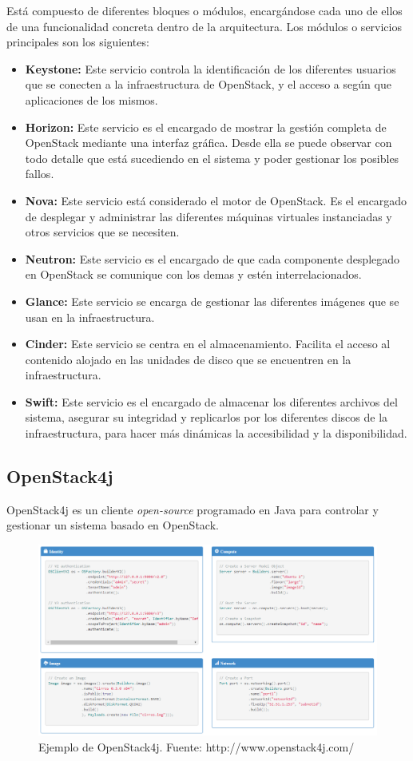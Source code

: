 Está compuesto de diferentes bloques o módulos, encargándose cada uno de ellos de una funcionalidad concreta dentro de la arquitectura. Los módulos o servicios principales son los siguientes:

\begin{itemize}
	\item \textbf{Keystone:}  Este servicio controla la identificación de los diferentes usuarios que se conecten a la infraestructura de OpenStack, y el acceso a según que aplicaciones de los mismos.
	
	\item \textbf{Horizon:} Este servicio es el encargado de mostrar la gestión completa de OpenStack mediante una interfaz gráfica. Desde ella se puede observar con todo detalle que está sucediendo en el sistema y poder gestionar los posibles fallos.
	
	\item \textbf{Nova:} Este servicio está considerado el motor de OpenStack. Es el encargado de desplegar y administrar las diferentes máquinas virtuales instanciadas y otros servicios que se necesiten.
	
	\item \textbf{Neutron:} Este servicio es el encargado de que cada componente desplegado en OpenStack se comunique con los demas y estén interrelacionados.
	
	\item \textbf{Glance:} Este servicio se encarga de gestionar las diferentes imágenes que se usan en la infraestructura.
	
	\item \textbf{Cinder:} Este servicio se centra en el almacenamiento. Facilita el acceso al contenido alojado en las unidades de disco que se encuentren en la infraestructura.
	
	\item \textbf{Swift:} Este servicio es el encargado de almacenar los diferentes archivos del sistema, asegurar su integridad y replicarlos por los diferentes discos de la infraestructura, para hacer más dinámicas la accesibilidad y la disponibilidad.
\end{itemize}

\subsection{OpenStack4j}
\label{subsec:openstack4j}

OpenStack4j es un cliente \textit{open-source} programado en Java para controlar y gestionar un sistema basado en OpenStack.

\begin{figure}[!ht]
	\centering
	\includegraphics[width=0.8\linewidth]{imagenes/ejemplo_os4j}
	\caption{Ejemplo de OpenStack4j. Fuente: http://www.openstack4j.com/}
	\label{fig:ejemploos4j}
\end{figure}


